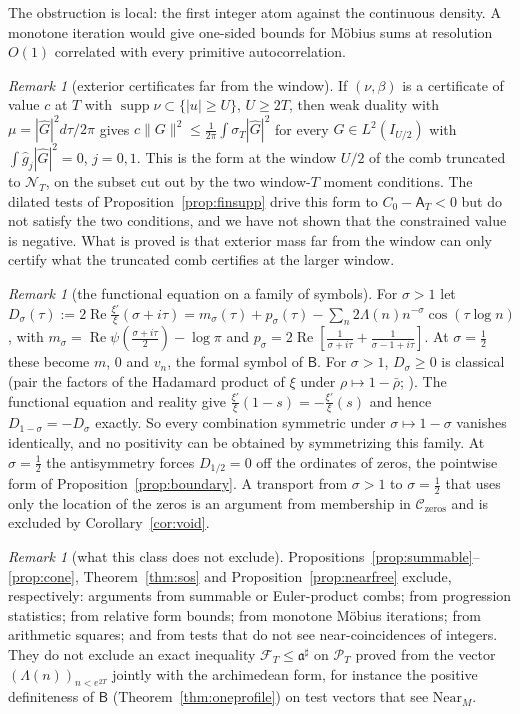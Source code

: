 \documentclass[11pt]{amsart}
\theoremstyle{definition}
\theoremstyle{remark}
\newtheorem{remark}[theorem]{Remark}
\newcommand{\Rel}{\operatorname{Re}}
\newcommand{\supp}{\operatorname{supp}}
\newcommand{\PT}{\mathcal P_T}
\newcommand{\sT}{\sigma_T}
\newcommand{\gh}[1]{\widehat g_{#1}}
\newcommand{\NT}{\mathcal N_T}
\newcommand{\Aconst}{\mathsf A_T}
\begin{document}
The obstruction is local: the first integer atom against the continuous density. A monotone iteration would give one-sided
bounds for M\"obius sums at resolution $O(1)$ correlated with every primitive autocorrelation.

\begin{remark}[exterior certificates far from the window]\label{rem:farext}
If $(\nu,\beta)$ is a certificate of value $c$ at $T$ with $\supp\nu\subset\{|u|\ge U\}$, $U\ge2T$, then weak duality with
$\mu=|\widehat G|^2d\tau/2\pi$ gives $c\|G\|^2\le\frac1{2\pi}\int\sT|\widehat G|^2$ for every $G\in L^2(I_{U/2})$ with $\int\gh j|\widehat G|^2=0$, $j=0,1$.
This is the form at the window $U/2$ of the comb truncated to $\NT$, on the subset cut out by the two window-$T$ moment conditions.
The dilated tests of Proposition~\ref{prop:finsupp} drive this form to $C_0-\Aconst<0$ but do not satisfy the two conditions,
and we have not shown that the constrained value is negative. What is proved is that exterior mass far from the window can only
certify what the truncated comb certifies at the larger window.
\end{remark}

\begin{remark}[the functional equation on a family of symbols]\label{rem:fe}
For $\sigma>1$ let $D_\sigma(\tau):=2\Rel\frac{\xi'}{\xi}(\sigma+i\tau)=m_\sigma(\tau)+p_\sigma(\tau)-\sum_n2\Lambda(n)n^{-\sigma}\cos(\tau\log n)$, with
$m_\sigma=\Rel\psi(\frac{\sigma+i\tau}2)-\log\pi$ and $p_\sigma=2\Rel[\frac1{\sigma+i\tau}+\frac1{\sigma-1+i\tau}]$. At $\sigma=\frac12$ these become $m$, $0$
and $v_n$, the formal symbol of $\mathsf B$. For $\sigma>1$, $D_\sigma\ge0$ is classical (pair the factors of the Hadamard product of $\xi$
under $\rho\mapsto1-\bar\rho$; \cite[Ch.~12]{Davenport2000}). The functional equation and reality give
$\frac{\xi'}{\xi}(1-s)=-\frac{\xi'}{\xi}(s)$ and hence $D_{1-\sigma}=-D_\sigma$ exactly. So every combination symmetric under $\sigma\mapsto1-\sigma$
vanishes identically, and no positivity can be obtained by symmetrizing this family. At $\sigma=\frac12$ the antisymmetry forces
$D_{1/2}=0$ off the ordinates of zeros, the pointwise form of Proposition~\ref{prop:boundary}. A transport from $\sigma>1$ to
$\sigma=\frac12$ that uses only the location of the zeros is an argument from membership in $\mathcal C_{\mathrm{zeros}}$ and is
excluded by Corollary~\ref{cor:void}.
\end{remark}

\begin{remark}[what this class does not exclude]\label{rem:bar-arith}
Propositions~\ref{prop:summable}--\ref{prop:cone}, Theorem~\ref{thm:sos} and Proposition~\ref{prop:nearfree} exclude, respectively:
arguments from summable or Euler-product combs; from progression statistics; from relative form bounds; from monotone M\"obius
iterations; from arithmetic squares; and from tests that do not see near-coincidences of integers. They do not exclude an exact
inequality $\mathcal F_T\le\mathfrak a^\sharp$ on $\PT$ proved from the vector $(\Lambda(n))_{n<e^{2T}}$ jointly with the archimedean form,
for instance the positive definiteness of $\mathsf B$ (Theorem~\ref{thm:oneprofile}) on test vectors that see $\mathrm{Near}_M$.
\end{remark}
\end{document}
